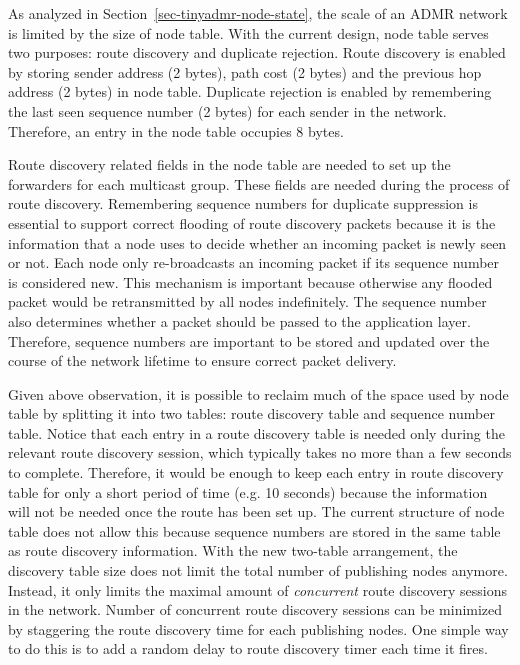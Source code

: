 As analyzed in Section~\ref{sec-tinyadmr-node-state}, the scale of an ADMR
network is limited by the size of node table. With the current design, node
table serves two purposes: route discovery and duplicate rejection. Route
discovery is enabled by storing sender address (2 bytes), path cost (2 bytes)
and the previous hop address (2 bytes) in node table. Duplicate rejection is
enabled by remembering the last seen sequence number (2 bytes) for each sender
in the network. Therefore, an entry in the node table occupies 8 bytes.

Route discovery related fields in the node table are needed to set up the
forwarders for each multicast group. These fields are needed during the
process of route discovery. Remembering sequence numbers for duplicate
suppression is essential to support correct flooding of route discovery packets
because it is the information that a node uses to decide whether an incoming
packet is newly seen or not. Each node only re-broadcasts an incoming packet
if its sequence number is considered new. This mechanism is important because
otherwise any flooded packet would be retransmitted by all nodes indefinitely. 
The sequence number also determines whether a packet should be
passed to the application layer. Therefore, sequence numbers are
important to be stored and updated over the course of the network
lifetime to ensure correct packet delivery.

Given above observation, it is possible to reclaim much of the space
used by node table by splitting it into two tables: route discovery
table and sequence number table. Notice that each entry in a route discovery table 
is needed only during the relevant route discovery session, which typically
takes no more than a few seconds to complete. Therefore, it would be enough
to keep each entry in route discovery table for only a short
period of time (e.g. 10 seconds) because the information will not be needed
once the route has been set up. The current structure of node table does not
allow this because sequence numbers are stored in the same table as route
discovery information. 
With the new two-table arrangement, the discovery table
size does not limit the total number of publishing nodes anymore. Instead, it only
limits the maximal amount of {\em concurrent} route discovery sessions in the
network. Number of concurrent route discovery sessions can be minimized by staggering
the route discovery time for each publishing nodes. One simple way to do this
is to add a random delay to route discovery timer each time it fires. 

